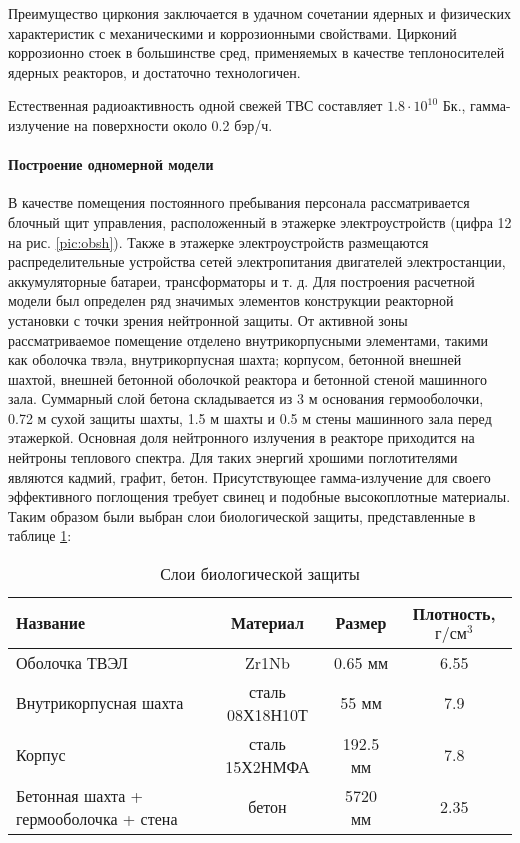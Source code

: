 Преимущество циркония заключается в удачном сочетании ядерных и физических характеристик с механическими и коррозионными свойствами. Цирконий коррозионно стоек в большинстве сред, применяемых в качестве теплоносителей ядерных реакторов, и достаточно технологичен.

Естественная радиоактивность одной свежей ТВС составляет $1.8 \cdot 10^{10}$ Бк., гамма- излучение на поверхности около 0.2 бэр/ч.


\paragraph{Построение одномерной модели} В качестве помещения постоянного пребывания персонала рассматривается блочный щит управления, расположенный в этажерке электроустройств (цифра 12 на рис. \ref{pic:obsh}). Также в этажерке электроустройств размещаются распределительные устройства сетей электропитания двигателей электростанции, аккумуляторные батареи, трансформаторы и т. д.
Для построения расчетной модели был определен ряд значимых элементов конструкции реакторной установки с точки зрения нейтронной защиты. От активной зоны рассматриваемое помещение отделено внутрикорпусными элементами, такими как оболочка твэла, внутрикорпусная шахта; корпусом, бетонной внешней шахтой, внешней бетонной оболочкой реактора и бетонной стеной машинного зала. Суммарный слой бетона складывается из 3 м основания гермооболочки, 0.72 м сухой защиты шахты, 1.5 м шахты и 0.5 м стены машинного зала перед этажеркой.
Основная доля нейтронного излучения в реакторе приходится на нейтроны теплового спектра. Для таких энергий хрошими поглотителями являются кадмий, графит, бетон. 
Присутствующее гамма-излучение для своего эффективного поглощения требует свинец и подобные высокоплотные материалы. Таким образом были выбран слои биологической защиты, представленные в таблице \ref{tabular:bio-sec-layers}:

\begin{table}[H]
	\caption{Слои биологической защиты}
	\begin{center}
        \begin{tabular}{|l|c|c|c|}
        \toprule
         Название & Материал & Размер & Плотность, $\text{г}/\text{см}^3$ \\ 
         \midrule
         \hline
         Оболочка ТВЭЛ & Zr1Nb & 0.65 мм & 6.55\\ 
         \hline
         Внутрикорпусная шахта & сталь 08Х18Н10Т & 55 мм & 7.9 \\ 
         \hline
         Корпус & сталь 15Х2НМФА & 192.5 мм & 7.8 \\ 
         \hline
         Бетонная шахта + гермооболочка + стена & бетон & 5720 мм & 2.35 \\ 
         \bottomrule
		\end{tabular}
		\label{tabular:bio-sec-layers}
	\end{center}
\end{table}

